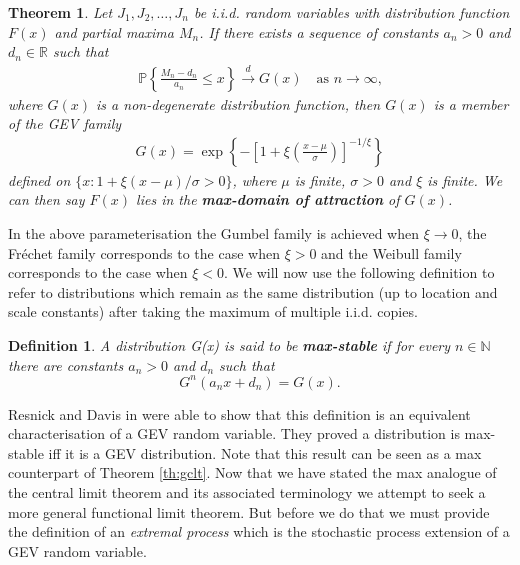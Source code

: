 \documentclass[honours,12pt]{unswthesis}
\newcommand{\R}{\mathbb{R}}
\newcommand{\N}{\mathbb{N}}
\newcommand{\PP}{\mathbb{P}}
\newcommand{\1}{\mathbf 1}
\newcommand{\cd}{\overset{d}{\longrightarrow}}
\newtheorem{theorem}[equation]{Theorem}
\newtheorem{definition}[equation]{Definition}
\numberwithin{equation}{section}
\theoremstyle{definition}
\theoremstyle{remark}
\begin{document}
\begin{theorem}\cite{ColesBook}
	Let $J_1,J_2,\ldots ,J_n$ be i.i.d. random variables with distribution function $F(x)$ and partial maxima $M_n$. If there exists a sequence of constants $a_n>0$ and $d_n\in \R$ such that
	\begin{align*}
	\PP\left\{\frac{M_n-d_n}{a_n}\leq x\right\}\cd G(x)\quad\textrm{as $n\to\infty$,}
	\end{align*}	
	where $G(x)$ is a non-degenerate distribution function, then $G(x)$ is a member of the GEV family
	\begin{align}\label{eq:GEV}
		G(x)=\exp\left\{-\left[1+\xi\left(\frac{x-\mu}{\sigma}\right)\right]^{-1/\xi}\right\}
	\end{align}	
	defined on $\{x:1+\xi(x-\mu)/\sigma>0\}$, where $\mu$ is finite, $\sigma>0$ and $\xi$ is finite. We can then say $F(x)$ lies in the \textbf{max-domain of attraction} of $G(x)$.
\end{theorem}
In the above parameterisation the Gumbel family is achieved when $\xi \to 0$, the Fr\'echet family corresponds to the case when $\xi>0$ and the Weibull family corresponds to the case when $\xi<0$. We will now use the following definition to refer to distributions which remain as the same distribution (up to location and scale constants) after taking the maximum of multiple i.i.d. copies.\\
\begin{definition}\cite{BalkemaResnick1977}
A distribution G(x) is said to be \textbf{max-stable} if for every $n\in\N$ there are constants $a_n>0$ and $d_n$ such that
\[
	G^n(a_n x + d_n)= G(x).
\]
\end{definition}

\noindent Resnick and Davis in \cite{DavisResnick1984} were able to show that this definition is an equivalent characterisation of a GEV random variable. They proved a distribution is max-stable iff it is a GEV distribution. Note that this result can be seen as a max counterpart of Theorem \ref{th:gclt}. Now that we have stated the max analogue of the central limit theorem and its associated terminology we attempt to seek a more general functional limit theorem. But before we do that we must provide the definition of an \emph{extremal process} which is the stochastic process extension of a GEV random variable.\\
\end{document}
